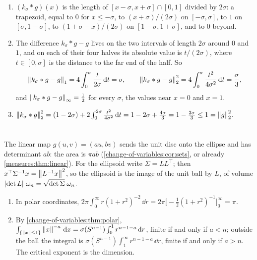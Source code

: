 \begin{enumerate}[nosep]
  \item $(k_\sigma*g)(x)$ is the length of
        $[x - \sigma, x + \sigma]\cap[0, 1]$ divided by $2\sigma$: a
        trapezoid, equal to $0$ for $x\leq-\sigma$, to
        $(x + \sigma)/(2\sigma)$ on $[-\sigma, \sigma]$, to $1$ on
        $[\sigma, 1 - \sigma]$, to $(1 + \sigma - x)/(2\sigma)$ on
        $[1 - \sigma, 1 + \sigma]$, and to $0$ beyond.
  \item The difference $k_\sigma*g - g$ lives on the two intervals of
        length $2\sigma$ around $0$ and $1$, and on each of their four
        halves its absolute value is $t/(2\sigma)$, where
        $t\in[0, \sigma]$ is the distance to the far end of the half.
        So
        \[
          \left\|k_\sigma*g - g\right\|_1 = 4\int_0^\sigma\frac t{2\sigma}\,\mathrm{d} t
          = \sigma , \qquad
          \left\|k_\sigma*g - g\right\|_2^2
          = 4\int_0^\sigma\frac{t^2}{4\sigma^2}\,\mathrm{d} t = \frac\sigma3 ,
        \]
        and $\left\|k_\sigma*g - g\right\|_\infty = \frac12$ for every $\sigma$,
        the values near $x = 0$ and $x = 1$.
  \item $\left\|k_\sigma*g\right\|_2^2
        = (1 - 2\sigma) + 2\int_0^{2\sigma}\frac{t^2}{4\sigma^2}\,\mathrm{d} t
        = 1 - 2\sigma + \frac{4\sigma}3 = 1 - \frac{2\sigma}3
        \leq1 = \left\|g\right\|_2^2$.
\end{enumerate}

\section{}

The linear map $g(u, v) = (au, bv)$ sends the unit disc onto the
ellipse and has determinant $ab$: the area is $\pi ab$
(\cref{change-of-variables:cor:sets}, or already
\cref{measures:thm:linear}). For the ellipsoid write
$\Sigma = LL^\top$; then $x^\top\Sigma^{-1}x = \left\|L^{-1}x\right\|^2$, so the
ellipsoid is the image of the unit ball by $L$, of volume
$\left|\det L\right|\,\omega_n = \sqrt{\det\Sigma}\;\omega_n$.

\begin{enumerate}[nosep]
  \item In polar coordinates,
        $2\pi\int_0^\infty r(1 + r^2)^{-2}\,\dd r
        = 2\pi\bigl[-\frac12(1 + r^2)^{-1}\bigr]_0^\infty = \pi$.
  \item By \cref{change-of-variables:thm:polar},
        $\int_{\{\left\|x\right\|\leq1\}}\left\|x\right\|^{-a}\,\mathrm{d} x
        = \sigma(S^{n-1})\int_0^1r^{n-1-a}\,\mathrm{d} r$, finite if and only
        if $a < n$; outside the ball the integral is
        $\sigma(S^{n-1})\int_1^\infty r^{n-1-a}\,\dd r$, finite if and
        only if $a > n$. The critical exponent is the dimension.
\end{enumerate}

